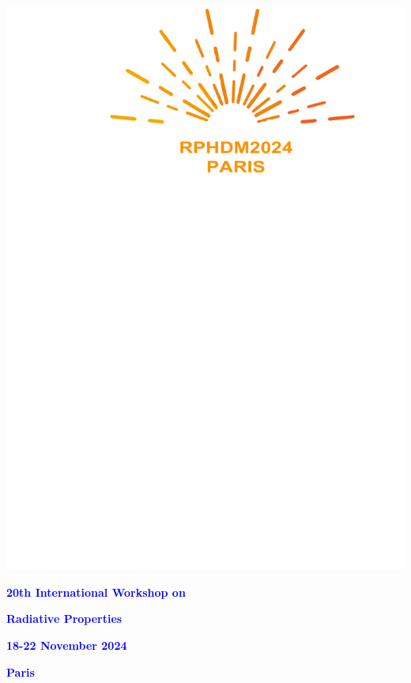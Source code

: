 \documentclass[11pt,a4paper]{report}
\begin{document}
\newpage\thispagestyle{empty}
\par\vspace{2cm}
\begin{minipage}[l]{8cm}
\begin{center}
\includegraphics[scale=.5]{LOGO-RPHDM}\hspace{1.5cm}
\end{center}
\end{minipage}
\begin{minipage}[l]{9cm}
\begin{Large}
	\textcolor{blue}{{\Large {\bf 20th International Workshop on}}}
\par\vspace{.8cm}
	\textcolor{blue}{{\Large {\bf Radiative Properties}}}
\par\vspace{8mm}
\textcolor{blue}{{\Large {\bf 18-22 November 2024}}}
\par\vspace{8mm}
\par
\textcolor{blue}{{\Large {\bf Paris}}}
\end{Large}
\end{minipage}\\
\par\vspace{5.cm}
\end{document}
